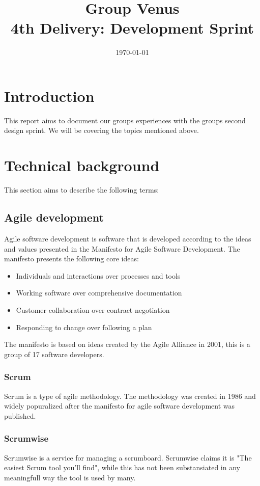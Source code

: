 \documentclass[12pt]{article}
\title{\textbf{Group Venus} \\ 4th Delivery: Development Sprint}
\date{\today}
\begin{document}
\subsectionfont{\fontsize{12}{14}\selectfont}

\maketitle

\pagebreak

\tableofcontents



\section{Introduction}
This report aims to document our groups experiences with the groups second design sprint.
We will be covering the topics mentioned above.

\section{Technical background}
This section aims to describe the following terms:
\subsection{Agile development\cite{AgileSoftwareDevelopment2024}}
Agile software development is software that is developed according to the ideas and values presented in the 
Manifesto for Agile Software Development\cite{ManifestoAgileSoftware}.
The manifesto presents the following core ideas:
\begin{itemize}
    \item Individuals and interactions over processes and tools
    \item Working software over comprehensive documentation
    \item Customer collaboration over contract negotiation
    \item Responding to change over following a plan
\end{itemize}
The manifesto is based on ideas created by the Agile Alliance in 2001, 
this is a group of 17 software developers.
\subsubsection{Scrum\cite{Scrum2023}}
Scrum is a type of agile methodology. The methodology was created in 1986 and widely popuralized 
after the manifesto for agile software development was published.
\subsubsection{Scrumwise\cite{scrumwiseScrumToolsScrum}}
Scrumwise is a service for managing a scrumboard. Scrumwise claims it is "The easiest Scrum tool you'll find", 
while this has not been substansiated in any meaningfull way the tool is used by many.
\end{document}
